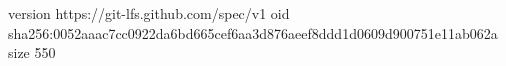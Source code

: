 version https://git-lfs.github.com/spec/v1
oid sha256:0052aaac7cc0922da6bd665cef6aa3d876aeef8ddd1d0609d900751e11ab062a
size 550

